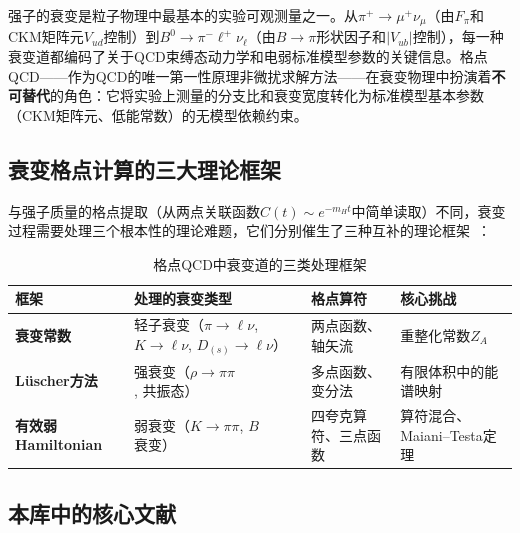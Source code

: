 \documentclass[12pt,a4paper]{ctexart}
\theoremstyle{definition}
\begin{document}
强子的衰变是粒子物理中最基本的实验可观测量之一。从$\pi^+ \to \mu^+ \nu_\mu$（由$F_\pi$和CKM矩阵元$V_{ud}$控制）到$B^0 \to \pi^- \ell^+ \nu_\ell$（由$B\to\pi$形状因子和$|V_{ub}|$控制），每一种衰变道都编码了关于QCD束缚态动力学和电弱标准模型参数的关键信息。格点QCD——作为QCD的唯一第一性原理非微扰求解方法——在衰变物理中扮演着\textbf{不可替代}的角色：它将实验上测量的分支比和衰变宽度转化为标准模型基本参数（CKM矩阵元、低能常数）的无模型依赖约束。

\subsection{衰变格点计算的三大理论框架}

与强子质量的格点提取（从两点关联函数$C(t) \sim e^{-m_H t}$中简单读取）不同，衰变过程需要处理三个根本性的理论难题，它们分别催生了三种互补的理论框架~\cite{GattringerLang2010}：

\begin{table}[H]
\centering
\caption{格点QCD中衰变道的三类处理框架}
\label{tab:decay_frameworks}
\small
\begin{tabular}{p{2.5cm}p{4cm}p{2.5cm}p{4cm}}
\toprule
\textbf{框架} & \textbf{处理的衰变类型} & \textbf{格点算符} & \textbf{核心挑战} \\
\midrule
\textbf{衰变常数} & 轻子衰变（$\pi\to\ell\nu$, $K\to\ell\nu$, $D_{(s)}\to\ell\nu$） & 两点函数、轴矢流 & 重整化常数$Z_A$ \\
\textbf{L\"uscher方法} & 强衰变（$\rho\to\pi\pi$, 共振态） & 多点函数、变分法 & 有限体积中的能谱映射 \\
\textbf{有效弱Hamiltonian} & 弱衰变（$K\to\pi\pi$, $B$衰变） & 四夸克算符、三点函数 & 算符混合、Maiani--Testa定理 \\
\bottomrule
\end{tabular}
\end{table}

\subsection{本库中的核心文献}
\end{document}
